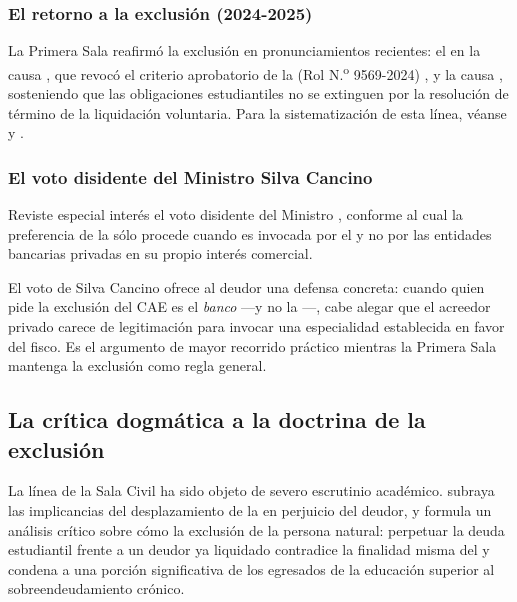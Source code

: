 \subsubsection{El retorno a la exclusión (2024-2025)}

La Primera Sala reafirmó la exclusión en pronunciamientos recientes: el  en la causa , que revocó el criterio
aprobatorio de la  (Rol N.\textsuperscript{o} 9569-2024)
\parencite{juris-cs-47641-2024-reemplazo}, y la causa 
\parencite{juris-cs-3557-2025}, sosteniendo que las obligaciones estudiantiles no se extinguen
por la resolución de término de la liquidación voluntaria. Para la sistematización de esta
línea, véanse \textcite{doc-cae-jurisprudencia} y \textcite{doc-cae-castro}.

\subsubsection{El voto disidente del Ministro Silva Cancino}

Reviste especial interés el voto disidente del Ministro ,
conforme al cual la preferencia de la \Lcae{} sólo procede cuando es invocada por el
 y no por las entidades bancarias privadas en su propio
interés comercial.

\begin{foco}
El voto de Silva Cancino ofrece al deudor una defensa concreta: cuando quien pide la exclusión
del CAE es el \emph{banco} ---y no la \tgr{}---, cabe alegar que el acreedor privado carece de
legitimación para invocar una especialidad establecida en favor del fisco. Es el argumento de
mayor recorrido práctico mientras la Primera Sala mantenga la exclusión como regla general.
\end{foco}

\subsection{La crítica dogmática a la doctrina de la exclusión}

La línea de la Sala Civil ha sido objeto de severo escrutinio académico. \textcite{caballero-cae}
subraya las implicancias del desplazamiento de la  en perjuicio
del deudor, y \textcite{alarcon-mala-fe} formula un análisis crítico sobre cómo la exclusión
 de la persona natural: perpetuar
la deuda estudiantil frente a un deudor ya liquidado contradice la finalidad misma del
\discharge{} y condena a una porción significativa de los egresados de la educación superior al
sobreendeudamiento crónico.

